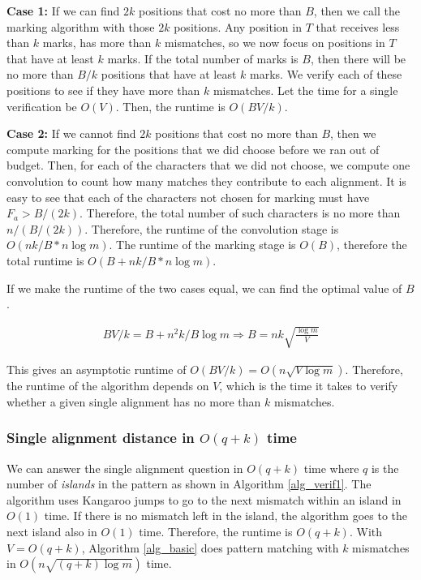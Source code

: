 {\bf Case 1:} If we can find $2k$ positions that cost no more than $B$, then
we call the marking algorithm with those $2k$ positions. Any
position in $T$ that receives less than $k$ marks, has more than $k$ mismatches,
so we now focus on positions in $T$ that have at least $k$ marks.
If the total number of marks is $B$, then there will be no more than
$B/k$ positions that have at least $k$ marks. We verify each of these
positions to see if they have more than $k$ mismatches. Let the time for a
single verification be $O(V)$.
Then, the runtime is $O(BV/k)$.

{\bf Case 2:} If we cannot find $2k$ positions that cost no more than $B$,
then we compute marking for the positions that we did choose before we ran out
of budget.
Then, for each of the characters that we did not choose, we compute one
convolution to count how many matches they contribute to each alignment. It
is easy to see that each of the characters not chosen for marking must have $F_a
> B/(2k)$.
Therefore, the total number of such characters is no more than $n/(B/(2k))$. Therefore, the runtime of the convolution stage is $O(nk/B * n \log m)$. The runtime of the marking
stage is $O(B)$, therefore the total runtime is $O(B + nk/B * n \log m)$.

If we make the runtime of the two cases equal, we can find the optimal value of
$B$.

\begin{align*}
BV/k = B+n^2k/B \log m \Rightarrow B=nk\sqrt{\frac{\log m}{V}}
\end{align*}

This gives an asymptotic runtime of $O(BV/k)=O(n\sqrt{V \log m})$. Therefore,
the runtime of the algorithm depends on $V$, which is the time it takes to
verify whether a given single alignment has no more than $k$ mismatches.
 
\subsubsection{Single alignment distance in $O(q+k)$ time}
\label{sec_alg1}

We can answer the single alignment question 
in $O(q+k)$ time where $q$ is the number of {\it islands} in the pattern as
shown in Algorithm \ref{alg_verif1}.
The algorithm uses Kangaroo jumps \cite{LV85} to go to the next mismatch within
an island in $O(1)$ time. If there is no mismatch left in the island, the algorithm goes
to the next island also in $O(1)$ time.
Therefore, the runtime is $O(q+k)$. With $V=O(q+k)$, Algorithm \ref{alg_basic} does pattern matching
with $k$ mismatches in $O(n\sqrt{(q+k)\log m})$ time.


